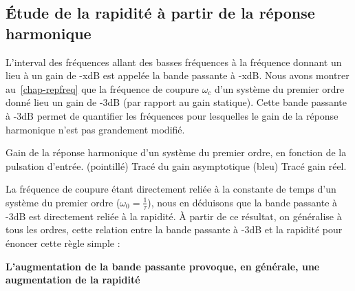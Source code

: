 \subsection{\'Etude de la rapidité à partir de la réponse harmonique}
L'interval des fréquences allant des basses fréquences à la 
fréquence donnant un lieu à un gain de -x\si{\dB} est appelée la bande 
passante à -x\si{\dB}.
Nous avons montrer au~\cref{chap-repfreq} que la fréquence de coupure $\omega_c$
d'un système du premier ordre donné lieu un gain de -3\si{\dB} 
(par rapport au gain statique). Cette bande passante à -3\si{\dB} permet 
de quantifier les fréquences pour lesquelles le gain de la réponse harmonique 
n'est pas grandement modifié. 
\begin{marginfigure}
    \centering
     
    \captionsetup{width=0.8\linewidth}
    \caption*{Gain de la réponse harmonique d'un système du premier ordre, 
    en fonction de la pulsation d'entrée. 
    (pointillé) Tracé du gain asymptotique (bleu) Tracé gain réel. }
\end{marginfigure}
La fréquence de coupure étant directement reliée à la constante de temps d'un 
système du premier ordre ($\omega_0=\frac{1}{\tau}$), nous en déduisons que la
bande passante à -3\si{\dB} est directement reliée à la rapidité. 
À partir de ce résultat, on généralise
à tous les ordres, cette relation entre la bande passante à 
-3\si{\dB} et la rapidité pour énoncer cette règle simple :

\textbf{L'augmentation de la bande passante provoque, en générale, une 
augmentation de la rapidité}
\newpage
\restoregeometry
\captionsetup{width=0.9\linewidth}
